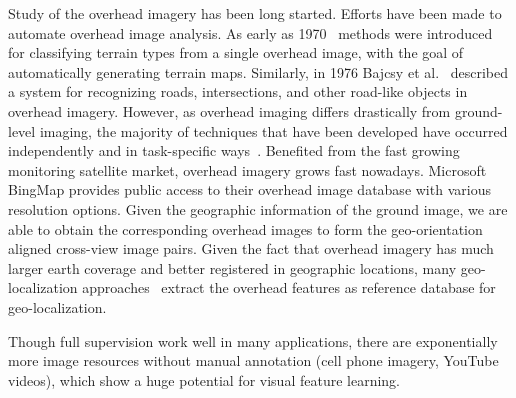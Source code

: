 Study of the overhead imagery has been long started.
Efforts have been made to automate overhead image analysis. As early
as 1970~\cite{idelsohn1970learning} methods were introduced for
classifying terrain types from a single overhead image, with the goal
of automatically generating terrain maps.  Similarly, in 1976 Bajcsy
et al.~\cite{bajcsy1976computer} described a system for recognizing
roads, intersections, and other road-like objects in overhead imagery.
However, as overhead imaging differs drastically from ground-level
imaging, the majority of techniques that have been developed have
occurred independently and in task-specific ways~\cite{Rozen}.
Benefited from the fast growing monitoring satellite market, overhead
imagery grows fast nowadays. Microsoft BingMap provides public access
to their overhead image database with various resolution options.
Given the geographic information of the ground image, we are able to
obtain the corresponding overhead images to form the geo-orientation
aligned cross-view image pairs.
%
Given the fact that overhead imagery has much larger earth coverage
and better registered in geographic locations, many geo-localization
approaches~\cite{lin2013cross,lin2015learning,workman2015geocnn,workman2015wide}
extract the overhead features as reference database for
geo-localization.



Though full supervision work well in many applications, there are
exponentially more image resources without manual annotation (cell
phone imagery, YouTube videos\etc), which show a huge potential for
visual feature learning.   

